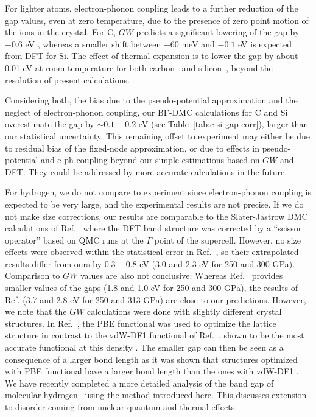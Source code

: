 For lighter atoms, electron-phonon coupling leads to a further reduction of the
gap values, even at zero temperature, due to the presence of zero point motion of the ions in
the crystal. For C, $GW$ predicts a significant lowering of the gap by $-0.6$ eV \cite{Giustino10}, whereas a smaller shift between $-60$ meV \cite{Monserrat14} and $-0.1$ eV \cite{Lautenschlager85} is expected from DFT for Si. The effect of thermal expansion is to lower the gap by about 0.01 eV at room temperature for both carbon~\cite{Monserrat2014,Clark1963} and silicon~\cite{Monserrat2016,Logothetidis1986}, beyond the resolution of present calculations.

Considering both, the bias due to the pseudo-potential approximation and the neglect of 
electron-phonon coupling, our BF-DMC calculations for C and Si overestimate the gap by $\sim 0.1-0.2$ eV
(see Table~\ref{tab:c-si-gap-corr}),
larger than our statistical uncertainty. This remaining offset to experiment may
either be due to residual bias of the
fixed-node approximation, or due to effects in pseudo-potential and
e-ph coupling beyond our simple estimations based on $GW$ and DFT.
They could be addressed by more accurate calculations in the future.

For hydrogen, we do not compare to experiment since electron-phonon coupling is
expected to be very large, and the experimental results are not precise.
If we do not make  size corrections, our results are comparable to the Slater-Jastrow DMC calculations of Ref.~\cite{Azadi2017}
where the DFT band structure was corrected by a ``scissor operator'' based on QMC runs at the $\Gamma$ point of the supercell. However, no size effects were observed within the statistical
error in Ref.~\cite{Azadi2017}, so their extrapolated results differ from ours
by $0.3-0.8$ eV (3.0 and 2.3 eV for 250 and 300 GPa).
Comparison to $GW$ values are also
not conclusive: 
Whereas Ref.~\cite{Lebegue2012} provides smaller values of the gaps (1.8 and 1.0 eV for 250 and 300 GPa), the results  of Ref. \cite{McMinis2015} (3.7 and 2.8 eV for 250 and 313 GPa)  are close to our predictions.
However, we note that  the $GW$ calculations were done with
slightly different crystal structures.
In Ref.~\cite{Lebegue2012}, the PBE functional was used to optimize the lattice structure
in contrast to the vdW-DF1 functional of Ref.~\cite{McMinis2015}, shown to be the most accurate functional at this density \cite{Clay2014}. The smaller gap can then
be seen as a consequence of  a larger bond length as it was shown that structures optimized with PBE functional have a larger bond length than the ones with vdW-DF1 \cite{McMinis2015}.
We have recently completed a more detailed analysis of the band gap of molecular hydrogen~\cite{Gorelov2019} using the method introduced here. This discusses extension to disorder coming from nuclear quantum and thermal effects.

